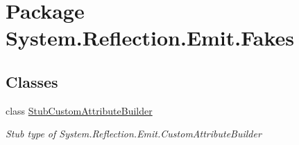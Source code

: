 \hypertarget{namespace_system_1_1_reflection_1_1_emit_1_1_fakes}{\section{Package System.\-Reflection.\-Emit.\-Fakes}
\label{namespace_system_1_1_reflection_1_1_emit_1_1_fakes}
}
\subsection*{Classes}
\begin{DoxyCompactItemize}
\item 
class \hyperlink{class_system_1_1_reflection_1_1_emit_1_1_fakes_1_1_stub_custom_attribute_builder}{Stub\-Custom\-Attribute\-Builder}
\begin{DoxyCompactList}\small\item\em Stub type of System.\-Reflection.\-Emit.\-Custom\-Attribute\-Builder\end{DoxyCompactList}\end{DoxyCompactItemize}
